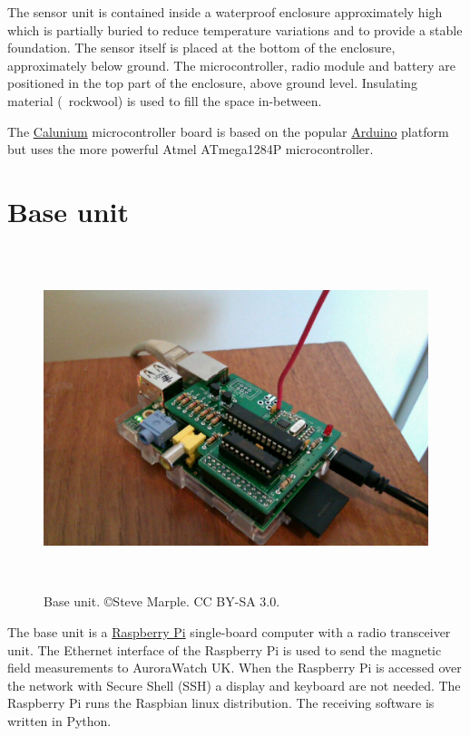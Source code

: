 The sensor unit is contained inside a waterproof enclosure
approximately  high which is partially buried to reduce
temperature variations and to provide a stable foundation. The sensor
itself is placed at the bottom of the enclosure, approximately
 below ground. The microcontroller, radio module and
battery are positioned in the top part of the enclosure, above ground
level. Insulating material (\eg\ rockwool) is used to fill the space
in-between.

The
\href{http://blog.stevemarple.co.uk/search/label/Calunium}{Calunium}
microcontroller board is based on the popular
\href{http://arduino.cc}{Arduino} platform but uses the more powerful
Atmel ATmega1284P microcontroller.

\section{Base unit}

\begin{figure}
  \centering
  \includegraphics[keepaspectratio,height=10cm]{images/base-unit}
  \caption[Base unit]%
  {Base unit. \small{\copyright Steve Marple. CC BY-SA 3.0.}}
  \label{fig:base-unit}
\end{figure}

The base unit is a \href{http://www.raspberrypi.org/‎}{Raspberry Pi}
single-board computer with a radio transceiver unit. The Ethernet
interface of the Raspberry Pi is used to send the magnetic field
measurements to AuroraWatch UK. When the Raspberry Pi is accessed over
the network with Secure Shell (SSH) a display and keyboard are not
needed. The Raspberry Pi runs the Raspbian linux distribution. The
receiving software is written in Python.

